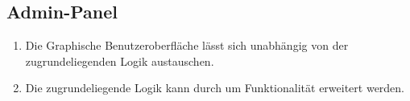 \subsection{Admin-Panel}

\begin{enumerate}
    \item Die Graphische Benutzeroberfläche lässt sich unabhängig von der zugrundeliegenden Logik austauschen.
    \item Die zugrundeliegende Logik kann durch %
        um Funktionalität erweitert werden.
\end{enumerate}